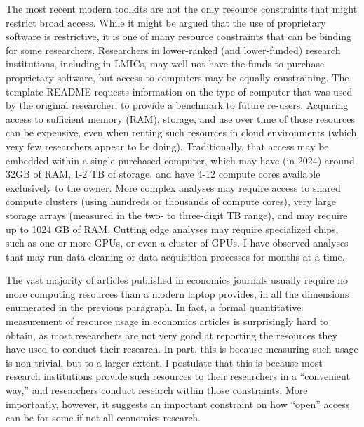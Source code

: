 \documentclass{article}
\begin{document}
The most recent modern toolkits are not the only resource constraints that might restrict broad access. While it might be argued that the use of proprietary software is restrictive, it is one of many resource constraints that can be binding for some researchers. Researchers in lower-ranked (and lower-funded) research institutions, including in \acp{LMIC}, may well not have the funds to purchase proprietary software, but access to computers may be equally constraining. The template README requests information on the type of computer that was used by the original researcher, to provide a benchmark to future re-users. Acquiring access to sufficient memory (\ac{RAM}), storage, and use over time of those resources can be expensive, even when renting such resources in cloud environments (which very few researchers appear to be doing). Traditionally, that access may be embedded within a single purchased computer, which may have (in 2024) around 32GB of RAM, 1-2 TB of storage, and have 4-12 compute cores available exclusively to the owner. More complex analyses may require access to shared compute clusters (using hundreds or thousands of compute cores), very large storage arrays (measured in the two- to three-digit TB range), and may require up to 1024 GB of RAM. Cutting edge analyses may require specialized chips, such as one or more \acp{GPU}, or even a cluster of \acp{GPU}. I have observed analyses that may run data cleaning or data acquisition processes for months at a time. 

The vast majority of articles published in economics journals usually require no more computing resources than a modern laptop provides, in all the dimensions enumerated in the previous paragraph. In fact, a formal quantitative measurement of resource usage in economics articles is surprisingly hard to obtain, as most researchers are not very good at reporting the resources they have used to conduct their research. In part, this is because measuring such usage is non-trivial, but to a larger extent, I postulate that this is because most research institutions provide such resources to their researchers in a ``convenient way,'' and researchers conduct research within those constraints. More importantly, however, it suggests an important constraint on how ``open'' access can be for some if not all economics research.
\end{document}
